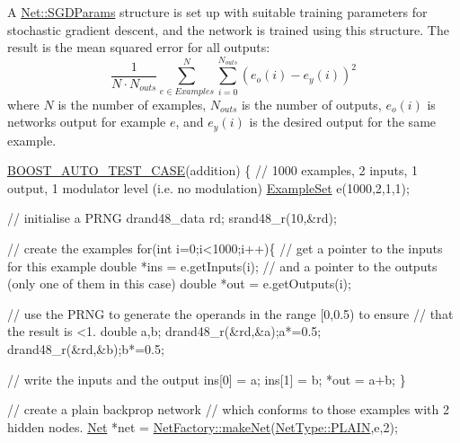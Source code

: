 A \hyperlink{structNet_1_1SGDParams}{Net\+::\+S\+G\+D\+Params} structure is set up with suitable training parameters for stochastic gradient descent, and the network is trained using this structure. The result is the mean squared error for all outputs\+: \[ \frac{1}{N\cdot N_{outs}}\sum^N_{e \in Examples} \sum_{i=0}^{N_{outs}} (e_o(i) - e_y(i))^2 \] where $N$ is the number of examples, $N_{outs}$ is the number of outputs, $e_o(i)$ is network\textquotesingle{}s output for example $e$, and $e_y(i)$ is the desired output for the same example.


\begin{DoxyCodeInclude}

\hyperlink{group__basictests_ga95e163533a64ba72e25fc8dfe7fbf065}{BOOST\_AUTO\_TEST\_CASE}(addition) \{
    \textcolor{comment}{// 1000 examples, 2 inputs, 1 output, 1 modulator level (i.e. no modulation)}
    \hyperlink{classExampleSet}{ExampleSet} e(1000,2,1,1);
    
    \textcolor{comment}{// initialise a PRNG}
    drand48\_data rd;
    srand48\_r(10,&rd);
    
    \textcolor{comment}{// create the examples}
    \textcolor{keywordflow}{for}(\textcolor{keywordtype}{int} i=0;i<1000;i++)\{
        \textcolor{comment}{// get a pointer to the inputs for this example}
        \textcolor{keywordtype}{double} *ins = e.getInputs(i);
        \textcolor{comment}{// and a pointer to the outputs (only one of them in this case)}
        \textcolor{keywordtype}{double} *out = e.getOutputs(i);
        
        \textcolor{comment}{// use the PRNG to generate the operands in the range [0,0.5) to ensure}
        \textcolor{comment}{// that the result is <1.}
        \textcolor{keywordtype}{double} a,b;
        drand48\_r(&rd,&a);a*=0.5;
        drand48\_r(&rd,&b);b*=0.5;
        
        \textcolor{comment}{// write the inputs and the output}
        ins[0] = a;
        ins[1] = b;
        *out = a+b;
    \}
    
    \textcolor{comment}{// create a plain backprop network}
    \textcolor{comment}{// which conforms to those examples with 2 hidden nodes.}
    \hyperlink{classNet}{Net} *net = \hyperlink{classNetFactory_abee207e81a04a7abf08e1f50bc2fe000}{NetFactory::makeNet}(\hyperlink{netType_8hpp_a1526df0fc932ccf720aa26267f923213af62eb0bf5e5c72e80983fbbac1cb70e5}{NetType::PLAIN},e,2);
    

\end{DoxyCodeInclude}
